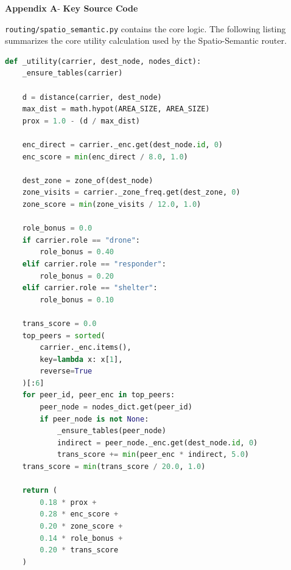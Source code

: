 \begin{center}
	{\Large \textbf{Appendix A}}-\vspace*{0.5 cm}
	{\Large \textbf{Key Source Code}}
	
\end{center}

\verb|routing/spatio_semantic.py| contains the core logic. The following listing summarizes the core utility calculation used by the Spatio-Semantic router.

\begin{lstlisting}[language=Python]
def _utility(carrier, dest_node, nodes_dict):
    _ensure_tables(carrier)

    d = distance(carrier, dest_node)
    max_dist = math.hypot(AREA_SIZE, AREA_SIZE)
    prox = 1.0 - (d / max_dist)

    enc_direct = carrier._enc.get(dest_node.id, 0)
    enc_score = min(enc_direct / 8.0, 1.0)

    dest_zone = zone_of(dest_node)
    zone_visits = carrier._zone_freq.get(dest_zone, 0)
    zone_score = min(zone_visits / 12.0, 1.0)

    role_bonus = 0.0
    if carrier.role == "drone":
        role_bonus = 0.40
    elif carrier.role == "responder":
        role_bonus = 0.20
    elif carrier.role == "shelter":
        role_bonus = 0.10

    trans_score = 0.0
    top_peers = sorted(
        carrier._enc.items(),
        key=lambda x: x[1],
        reverse=True
    )[:6]
    for peer_id, peer_enc in top_peers:
        peer_node = nodes_dict.get(peer_id)
        if peer_node is not None:
            _ensure_tables(peer_node)
            indirect = peer_node._enc.get(dest_node.id, 0)
            trans_score += min(peer_enc * indirect, 5.0)
    trans_score = min(trans_score / 20.0, 1.0)

    return (
        0.18 * prox +
        0.28 * enc_score +
        0.20 * zone_score +
        0.14 * role_bonus +
        0.20 * trans_score
    )
\end{lstlisting}

